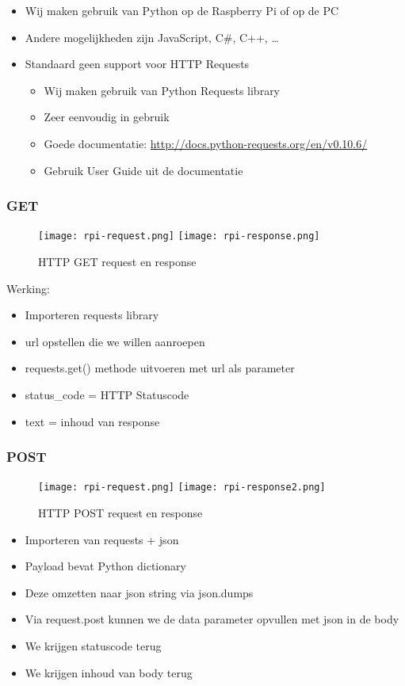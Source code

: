 \documentclass{article}
\begin{document}
\begin{itemize}
    \item Wij maken gebruik van Python op de Raspberry Pi of op de PC
    \item Andere mogelijkheden zijn JavaScript, C\#, C++, \dots
    \item Standaard geen support voor HTTP Requests
    \begin{itemize}
        \item Wij maken gebruik van Python Requests library
        \item Zeer eenvoudig in gebruik
        \item Goede documentatie: \url{http://docs.python-requests.org/en/v0.10.6/}
        \item Gebruik User Guide uit de documentatie
    \end{itemize}
\end{itemize}

\subsubsection{GET}

\begin{figure}[H]
    \centering
    \texttt{[image: rpi-request.png]}
    \texttt{[image: rpi-response.png]}
    \caption{HTTP GET request en response}
\end{figure}

Werking: 
\begin{itemize}
    \item Importeren requests library
    \item url opstellen die we willen aanroepen
    \item requests.get() methode uitvoeren met url als parameter
    \item status\_code = HTTP Statuscode
    \item text = inhoud van response
\end{itemize}

\subsubsection{POST}

\begin{figure}[H]
    \centering
    \texttt{[image: rpi-request.png]}
    \texttt{[image: rpi-response2.png]}
    \caption{HTTP POST request en response}
\end{figure}

\begin{itemize}
    \item Importeren van requests + json
    \item Payload bevat Python dictionary
    \item Deze omzetten naar json string via json.dumps
    \item Via request.post kunnen we de data parameter opvullen met json in de body
    \item We krijgen statuscode terug
    \item We krijgen inhoud van body terug
\end{itemize}
\end{document}
